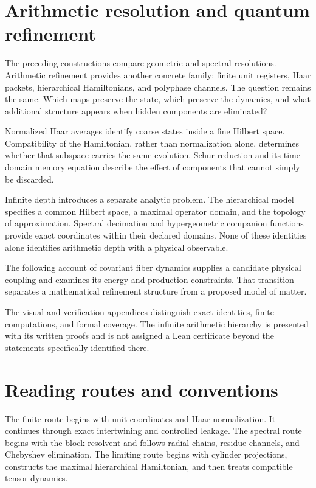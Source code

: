 \section*{Arithmetic resolution and quantum refinement}
The preceding constructions compare geometric and spectral resolutions. Arithmetic refinement provides another concrete family: finite unit registers, Haar packets, hierarchical Hamiltonians, and polyphase channels. The question remains the same. Which maps preserve the state, which preserve the dynamics, and what additional structure appears when hidden components are eliminated?

Normalized Haar averages identify coarse states inside a fine Hilbert space. Compatibility of the Hamiltonian, rather than normalization alone, determines whether that subspace carries the same evolution. Schur reduction and its time-domain memory equation describe the effect of components that cannot simply be discarded.

Infinite depth introduces a separate analytic problem. The hierarchical model specifies a common Hilbert space, a maximal operator domain, and the topology of approximation. Spectral decimation and hypergeometric companion functions provide exact coordinates within their declared domains. None of these identities alone identifies arithmetic depth with a physical observable.

The following account of covariant fiber dynamics supplies a candidate physical coupling and examines its energy and production constraints. That transition separates a mathematical refinement structure from a proposed model of matter.

The visual and verification appendices distinguish exact identities, finite computations, and formal coverage. The infinite arithmetic hierarchy is presented with its written proofs and is not assigned a Lean certificate beyond the statements specifically identified there.

\clearpage
\section*{Reading routes and conventions}
The finite route begins with unit coordinates and Haar normalization. It continues through exact intertwining and controlled leakage. The spectral route begins with the block resolvent and follows radial chains, residue channels, and Chebyshev elimination. The limiting route begins with cylinder projections, constructs the maximal hierarchical Hamiltonian, and then treats compatible tensor dynamics.

